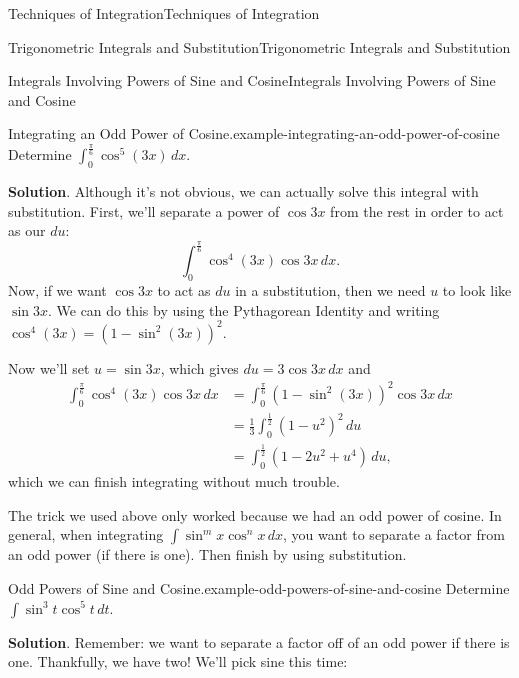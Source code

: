 \documentclass[10pt,]{book}
\numberwithin{equation}{section}
\begin{document}
\begin{chapterptx}{Techniques of Integration}{}{Techniques of Integration}{}{}
\begin{sectionptx}{Trigonometric Integrals and Substitution}{}{Trigonometric Integrals and Substitution}{}{}
\typeout{************************************************}
%
\begin{subsectionptx}{Integrals Involving Powers of Sine and Cosine}{}{Integrals Involving Powers of Sine and Cosine}{}{}\label{subsection-integrals-involving-powers-of-sine-and-cosine}
\begin{example}{Integrating an Odd Power of Cosine.}{example-integrating-an-odd-power-of-cosine}%
\hypertarget{p-520}{}%
Determine \(\int_{0}^{\frac{\pi}{6}}\cos^{5}(3x)\,dx\).%
\par\smallskip%
\noindent\textbf{Solution}.\hypertarget{solution-114}{}\quad%
\hypertarget{p-521}{}%
Although it's not obvious, we can actually solve this integral with substitution. First, we'll separate a power of \(\cos3x\) from the rest in order to act as our \(du\):%
\begin{equation*}
\int_{0}^{\frac{\pi}{6}}\cos^{4}(3x)\cos3x\,dx.
\end{equation*}
Now, if we want \(\cos3x\) to act as \(du\) in a substitution, then we need \(u\) to look like \(\sin3x\). We can do this by using the Pythagorean Identity and writing \(\cos^{4}(3x) = (1 - \sin^{2}(3x))^{2}\).%
\par
\hypertarget{p-522}{}%
Now we'll set \(u = \sin3x\), which gives \(du = 3\cos3x\,dx\) and%
%
\begin{align*}
\int_{0}^{\frac{\pi}{6}}\cos^{4}(3x)\cos3x\,dx & = \int_{0}^{\frac{\pi}{6}}(1-\sin^{2}(3x))^{2}\cos3x\,dx \\
& = \frac{1}{3}\int_{0}^{\frac{1}{2}}(1 - u^{2})^{2}\,du \\
& = \int_{0}^{\frac{1}{2}}(1 - 2u^{2} + u^{4})\,du, 
\end{align*}
\hypertarget{p-523}{}%
which we can finish integrating without much trouble.%
\end{example}
\hypertarget{p-524}{}%
The trick we used above only worked because we had an odd power of cosine. In general, when integrating \(\int\sin^{m}x\cos^{n}x\,dx\), you want to separate a factor from an odd power (if there is one). Then finish by using substitution.%
\begin{example}{Odd Powers of Sine and Cosine.}{example-odd-powers-of-sine-and-cosine}%
\hypertarget{p-525}{}%
Determine \(\int\sin^{3}t\cos^{5}t\,dt\).%
\par\smallskip%
\noindent\textbf{Solution}.\hypertarget{solution-115}{}\quad%
\hypertarget{p-526}{}%
Remember: we want to separate a factor off of an odd power if there is one. Thankfully, we have two! We'll pick sine this time:%
%

\end{example}
\end{subsectionptx}
\end{sectionptx}
\end{chapterptx}
\end{document}
